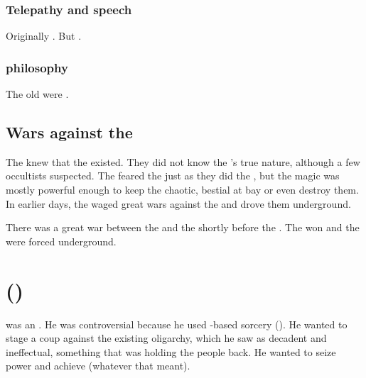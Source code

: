 \subsubsection{Telepathy and speech}
Originally . 
But . 





\subsubsection{\Ophidian{} philosophy}
The old \ophidians{} were . 









\subsection{Wars against the \noggyaleth}
The \ophidians knew that the \noggyaleth existed. 
They did not know the \noggyaleth's true nature, although a few occultists suspected.
The \ophidians feared the \noggyaleth just as they did the \xss, but the \ophidian magic was mostly powerful enough to keep the chaotic, bestial \noggyaleth at bay or even destroy them.
In earlier days, the \ophidians waged great wars against the \noggyaleth and drove them underground.

There was a great war between the \ophidians and the \noggyaleth shortly before the \firstbanewar.
The \ophidians won and the \noggyaleth were forced underground.














\section{\Sethicus ()}
\Sethicus was an \ophidian.
He was controversial because he used \xs{}-based sorcery ().
He wanted to stage a coup against the existing \ophidian oligarchy, which he saw as decadent and ineffectual, something that was holding the \ophidian people back. 
He wanted to seize power and achieve  (whatever that meant). 

